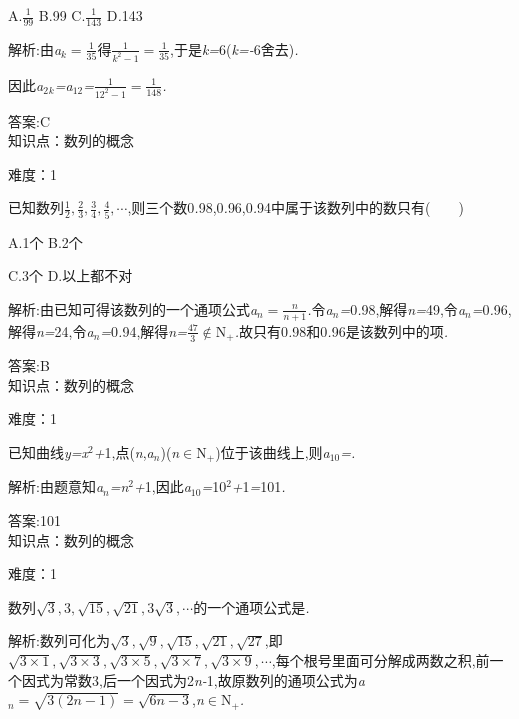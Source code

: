 \documentclass{article} %
\begin{document}
 A.$\frac{1}{99}$ B.99 C.$\frac{1}{143}$ D\textit{.}143

 解析:由\textit{a${}_{k}=\frac{1}{35}$}得$\frac{1}{k^2-1}=\frac{1}{35}$,于是\textit{k=}6(\textit{k=-}6舍去)\textit{.}

因此\textit{a}${}_{2}$\textit{${}_{k}$=a}${}_{12}$\textit{=}$\frac{1}{12^2-1}=\frac{1}{148}$\textit{.}
 
 答案:C \\

知识点：数列的概念

难度：1 
  
已知数列$\frac{1}{2},\frac{2}{3},\frac{3}{4},\frac{4}{5},\cdots$,则三个数0\textit{.}98,0\textit{.}96,0\textit{.}94中属于该数列中的数只有(\textit{　　})

 A.1个 B.2个

 C.3个 D.以上都不对

 解析:由已知可得该数列的一个通项公式\textit{a${}_{n}=\frac{n}{n+1}$}\textit{.}令\textit{a${}_{n}$=}0\textit{.}98,解得\textit{n=}49,令\textit{a${}_{n}$=}0\textit{.}96,解得\textit{n=}24,令\textit{a${}_{n}$=}0\textit{.}94,解得\textit{n=}$\frac{47}{3}\mathrm{\notin}$N${}_{+}$\textit{.}故只有0\textit{.}98和0\textit{.}96是该数列中的项\textit{.} 

 答案:B \\

知识点：数列的概念

难度：1
  
已知曲线\textit{y=x}${}^{2}$\textit{+}1,点(\textit{n},\textit{a${}_{n}$})(\textit{n}$\mathrm{\in}$N\textit{${}_{+}$})位于该曲线上,则\textit{a}${}_{10}$\textit{=\underbar{　　　　　}.~}

 解析:由题意知\textit{a${}_{n}$=n}${}^{2}$\textit{+}1,因此\textit{a}${}_{10}$\textit{=}10${}^{2}$\textit{+}1\textit{=}101\textit{.}

 答案:101 \\

知识点：数列的概念

难度：1
  
数列$\sqrt{3},3,\sqrt{15},\sqrt{21},3\sqrt{3},\cdots$的一个通项公式是\textit{\underbar{　　　　　　　　　　}.~}

 解析:数列可化为$\sqrt{3},\sqrt{9},\sqrt{15},\sqrt{21},\sqrt{27}$,即$\sqrt{3\times 1},\sqrt{3\times 3},\sqrt{3 \times 5},\sqrt{3 \times 7},\sqrt{3 \times 9},\cdots$,每个根号里面可分解成两数之积,前一个因式为常数3,后一个因式为2\textit{n-}1,故原数列的通项公式为\textit{a${}_{n}=\sqrt{3(2n-1)}=\sqrt{6n-3}$},\textit{n}$\mathrm{\in}$N\textit{${}_{+}$.}
\end{document}
